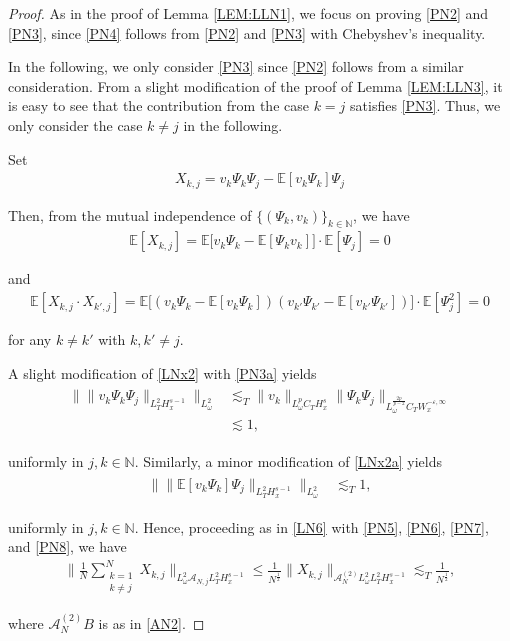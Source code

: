 \documentclass[letterpaper, 11pt,  reqno]{amsart}
\newcommand{\1}{\hspace{0.5mm}\text{I}\hspace{0.2mm}}
\newcommand{\noi}{\noindent}
\newcommand{\N}{\mathbb{N}}
\newcommand{\E}{\mathbb{E}}
\newcommand{\eps}{\varepsilon}
\newcommand{\les}{\lesssim}
\newcommand{\A}{\mathcal{A}}
\renewcommand{\o}{\omega}
\numberwithin{equation}{section}
\numberwithin{theorem}{section}
\begin{document}
\begin{proof}
As in the proof of Lemma \ref{LEM:LLN1}, 
we focus on proving \eqref{PN2}
and \eqref{PN3}, since \eqref{PN4}
follows from 
\eqref{PN2}
and \eqref{PN3} with Chebyshev's inequality.

In the following, we only consider \eqref{PN3} since \eqref{PN2} follows
from a similar consideration.
From a slight modification of the proof of Lemma \ref{LEM:LLN3}, 
it is easy to see that 
the contribution from the case $k = j$
satisfies  \eqref{PN3}. 
Thus, we only consider the case $k \ne j$ in the following.


Set
\begin{align*}
X_{k, j} = v_k \Psi_k \Psi_j -  \E [v_k\Psi_k ] \Psi_j
\end{align*}

\noi
Then, 
from the mutual independence of $\{(\Psi_k, v_k)\}_{k \in \N}$, %
we have
\begin{align}
\E[X_{k, j}]
 = 
\E\big[v_k  \Psi_k  -  \E [\Psi_k v_k]\big] \cdot \E[ \Psi_j]
 = 0
\label{PN5}
\end{align}

\noi
and 
\begin{align}
\E[X_{k, j}\cdot X_{k', j}]
 = 
\E\big[(v_k  \Psi_k  -  \E [v_k \Psi_k ])(v_{k'}  \Psi_{k'}  -  \E [v_{k'}\Psi_{k'} ])\big] \cdot \E[ \Psi_j^2]
 = 0
\label{PN6}
\end{align}

\noi
for any $k \ne k'$ with $k, k' \ne j$.


A slight modification of \eqref{LNx2} 
with \eqref{PN3a} yields
\begin{align}
\begin{split}
\Big\| \| v_k \Psi_k \Psi_j \|_{L_T^2 H_x^{s-1}} \Big\|_{L^2_\o}
&\les_T  \| v_k \|_{L^p_\o C_T  H_x^{s}}
 \|  \Psi_k \Psi_j \|_{L^\frac{2p}{p-2}_\o C_T  W_x^{- \eps, \infty}}\\
 & \les 1,  
\end{split}
\label{PN7}
\end{align}


\noi
uniformly in $j, k \in \N$.
Similarly, 
a minor modification of \eqref{LNx2a} yields
\begin{align}
\begin{split}
 \Big\| \| \E [ v_k \Psi_k ] \Psi_j \|_{L_T^2 H_x^{s-1}} \Big\|_{L^2_\o}
 & \les_T 1, 
\end{split}
\label{PN8}
\end{align}

\noi
uniformly in $j, k \in \N$.
Hence, proceeding as in \eqref{LN6} with 
\eqref{PN5}, \eqref{PN6}, 
\eqref{PN7},  and \eqref{PN8}, 
we have 
\begin{align*}
\bigg\| \frac 1N \sum_{\substack{k = 1\\k \ne j}}^N X_{k, j}
\bigg\|_{L^2_\o\A_{N, j}L_T^2 H_x^{s-1}}
\le \frac 1{N^\frac 12}
\|  X_{k, j}\|_{\A_{N}^{(2)}L^2_\o L_T^2 H_x^{s-1}}
\les_T \frac 1{N^\frac 12}, 
\end{align*}

\noi
where $\A_{N}^{(2)}B$ is as in \eqref{AN2}.
\end{proof}
\end{document}
